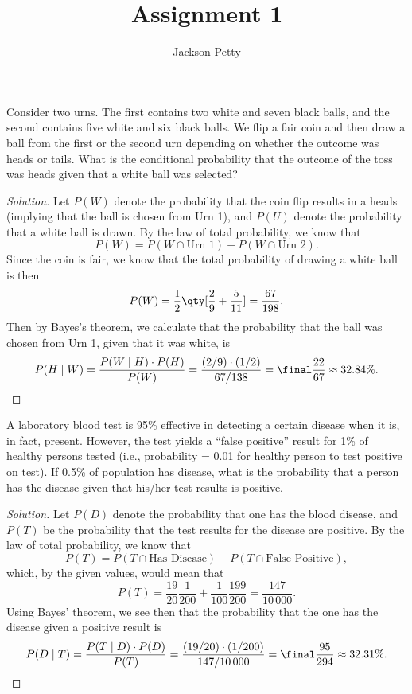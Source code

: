 \documentclass[10pt, physics]{homework}
\title{Assignment 1}
\author{Jackson Petty}
\begin{document}
	\begin{problem}[4pts]
		Consider two urns. The first contains two white and seven black balls, and the second contains five white and six black balls. We flip a fair coin and then draw a ball from the first or the second urn depending on whether the outcome was heads or tails. What is the conditional probability that the outcome of the toss was heads given that a white ball was selected?
	\end{problem}
	\begin{proof}[Solution]
		Let $P(W)$ denote the probability that the coin flip results in a heads (implying that the ball is chosen from Urn 1), and $P(U)$ denote the probability that a white ball is drawn.
		By the law of total probability, we know that 
		\[ P(W) = P(W \cap \text{Urn 1}) + P(W \cap \text{Urn 2}). \]
		Since the coin is fair, we know that the total probability of drawing a white ball is then
		\[ P(W) = \frac{1}{2}\qty[\frac{2}{9} + \frac{5}{11}] = \frac{67}{198}. \]
		Then by Bayes's theorem, we calculate that the probability that the ball was chosen from Urn 1, given that it was white, is
		\[ P(H \mid W) = \frac{P(W \mid H) \cdot P(H)}{P(W)} = \frac{(2/9) \cdot (1/2)}{67/138} = \final{\frac{22}{67} \approx 32.84\%.}\qedhere \]
	\end{proof}

	\begin{problem}[4pts]
		A laboratory blood test is 95\% effective in detecting a certain disease when it is, in fact, present. However, the test yields a ``false positive'' result for 1\% of healthy persons tested (i.e., probability = 0.01 for healthy person to test positive on test). If 0.5\% of population has disease, what is the probability that a person has the disease given that his/her test results is positive.
	\end{problem}
	\begin{proof}[Solution]
		Let $P(D)$ denote the probability that one has the blood disease, and $P(T)$ be the probability that the test results for the disease are positive.
		By the law of total probability, we know that 
		\[ P(T) = P(T \cap \text{Has Disease}) + P(T \cap \text{False Positive}), \]
		which, by the given values, would mean that 
		\[ P(T) = \frac{19}{20}\frac{1}{200} + \frac{1}{100}\frac{199}{200} = \frac{147}{10\,000}. \]
		Using Bayes' theorem, we see then that the probability that the one has the disease given a positive result is 
		\[ P(D \mid T) = \frac{P(T \mid D)\cdot P(D)}{P(T)} = \frac{(19/20)\cdot(1/200)}{147/10\,000} = \final{\frac{95}{294} \approx 32.31\%.}\qedhere \]
	\end{proof}
\end{document}
